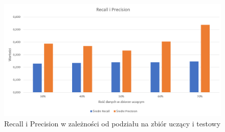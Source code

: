 \documentclass{classrep}
\begin{document}
{\begin{figure}[H]
\caption{Recall i Precision w zależności od podziału na zbiór uczący i testowy}
\centering
\includegraphics[width=1\textwidth]{i4}
\end{figure}


}
\end{document}
